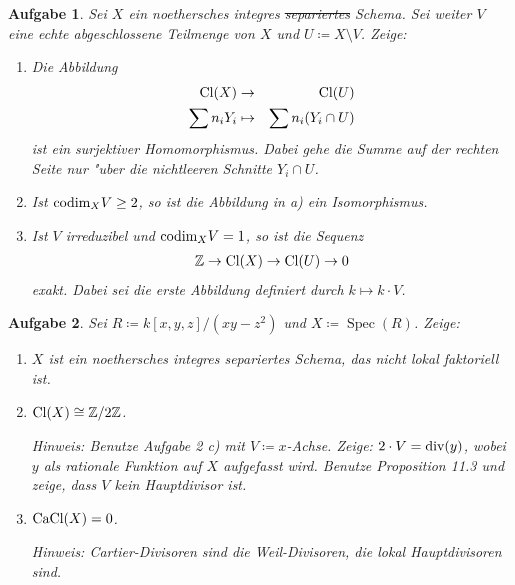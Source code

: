 \documentclass[paper = A4, fontsize=12pt, numbers=noendperiod, chapterprefix=true]{scrbook}
\theoremstyle{break}
\newtheorem{Aufg}{Aufgabe}
\theoremstyle{nonumberbreak}
\theoremstyle{nonumberplain}
\DeclareMathOperator{\Spec}{Spec}
\newcommand{\Z}{\mathbb{Z}}
\begin{document}
\begin{Aufg}
Sei $X$ ein noethersches integres \sout{separiertes} Schema. Sei weiter $V$ eine echte abgeschlossene Teilmenge von $X$ und $U\coloneqq X \setminus V$. Zeige:
\begin{enumerate}%
\item[a)] Die Abbildung
\begin{eqnarray*}
\textup{Cl}(X) & \rightarrow & \textup{Cl}(U)\\
\sum n_i Y_i & \mapsto & \sum n_i(Y_i \cap U)
\end{eqnarray*}
ist ein surjektiver Homomorphismus. Dabei gehe die Summe auf der rechten Seite nur "uber die nichtleeren Schnitte $Y_i\cap U$.
\item[b)] Ist $\textup{codim}_X V \geq 2$, so ist die Abbildung in a) ein Isomorphismus.
\item[c)] Ist $V$ irreduzibel und $\textup{codim}_X V=1$, so ist die Sequenz
\begin{eqnarray*}
\Z \rightarrow \textup{Cl}(X) \rightarrow \textup{Cl}(U) \rightarrow 0
\end{eqnarray*}
exakt. Dabei sei die erste Abbildung definiert durch $k \mapsto k \cdot V$.
\end{enumerate}
\end{Aufg}


\begin{Aufg}
Sei $R\coloneqq k[x,y,z]/(xy-z^2)$ und $X \coloneqq \Spec(R)$. Zeige:
\begin{enumerate}%
\item[a)] $X$ ist ein noethersches integres separiertes Schema, das nicht lokal faktoriell ist.
\item[b)] $\textup{Cl}(X) \cong \Z/2\Z$.

\textit{Hinweis: Benutze Aufgabe 2 c) mit $V\coloneqq x$-Achse. Zeige: $2\cdot V=\textup{div}(y)$, wobei $y$ als rationale Funktion auf $X$ aufgefasst wird. Benutze Proposition 11.3 und zeige, dass $V$ kein Hauptdivisor ist.}
\item[c)] $\textup{CaCl}(X) =0$.

\textit{Hinweis: Cartier-Divisoren sind die Weil-Divisoren, die lokal Hauptdivisoren sind.}
\end{enumerate}
\end{Aufg}
\end{document}
